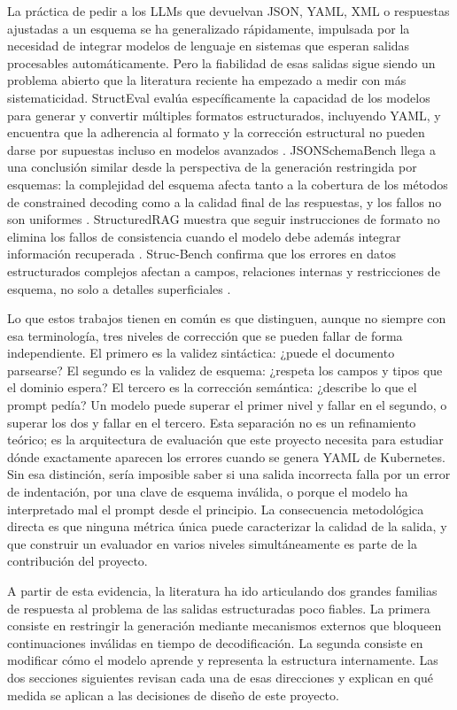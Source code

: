 La práctica de pedir a los LLMs que devuelvan JSON, YAML, XML o respuestas ajustadas a un esquema se ha generalizado rápidamente, impulsada por la necesidad de integrar modelos de lenguaje en sistemas que esperan salidas procesables automáticamente. Pero la fiabilidad de esas salidas sigue siendo un problema abierto que la literatura reciente ha empezado a medir con más sistematicidad. StructEval evalúa específicamente la capacidad de los modelos para generar y convertir múltiples formatos estructurados, incluyendo YAML, y encuentra que la adherencia al formato y la corrección estructural no pueden darse por supuestas incluso en modelos avanzados \citep{yang2025structeval}. JSONSchemaBench llega a una conclusión similar desde la perspectiva de la generación restringida por esquemas: la complejidad del esquema afecta tanto a la cobertura de los métodos de constrained decoding como a la calidad final de las respuestas, y los fallos no son uniformes \citep{geng2025jsonschemabench}. StructuredRAG muestra que seguir instrucciones de formato no elimina los fallos de consistencia cuando el modelo debe además integrar información recuperada \citep{lee2024structuredrag}. Struc-Bench confirma que los errores en datos estructurados complejos afectan a campos, relaciones internas y restricciones de esquema, no solo a detalles superficiales \citep{li2023strucbench}.

Lo que estos trabajos tienen en común es que distinguen, aunque no siempre con esa terminología, tres niveles de corrección que se pueden fallar de forma independiente. El primero es la validez sintáctica: ¿puede el documento parsearse? El segundo es la validez de esquema: ¿respeta los campos y tipos que el dominio espera? El tercero es la corrección semántica: ¿describe lo que el prompt pedía? Un modelo puede superar el primer nivel y fallar en el segundo, o superar los dos y fallar en el tercero. Esta separación no es un refinamiento teórico; es la arquitectura de evaluación que este proyecto necesita para estudiar dónde exactamente aparecen los errores cuando se genera YAML de Kubernetes. Sin esa distinción, sería imposible saber si una salida incorrecta falla por un error de indentación, por una clave de esquema inválida, o porque el modelo ha interpretado mal el prompt desde el principio. La consecuencia metodológica directa es que ninguna métrica única puede caracterizar la calidad de la salida, y que construir un evaluador en varios niveles simultáneamente es parte de la contribución del proyecto.

A partir de esta evidencia, la literatura ha ido articulando dos grandes familias de respuesta al problema de las salidas estructuradas poco fiables. La primera consiste en restringir la generación mediante mecanismos externos que bloqueen continuaciones inválidas en tiempo de decodificación. La segunda consiste en modificar cómo el modelo aprende y representa la estructura internamente. Las dos secciones siguientes revisan cada una de esas direcciones y explican en qué medida se aplican a las decisiones de diseño de este proyecto.

